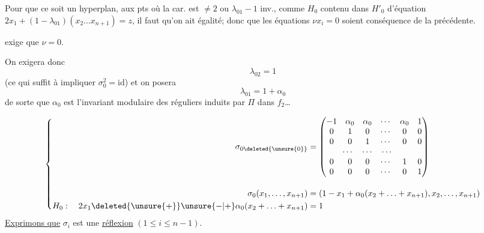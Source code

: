
Pour que ce soit un hyperplan,   aux pts où la car. est $\neq2$  ou $\lambda_{01}-1$ inv., comme  $H_0$ contenu dans $H'_0$ d'équation $2x_1+(1-\lambda_{01})(x_2\ldots x_{n+1})=z$, il faut qu'on ait égalité; donc que les équations $\nu x_i=0$  soient conséquence de la précédente.

  exige  que $\nu=0$.


On exigera donc
\[
\lambda_{02}=1
\]
 (ce qui suffit à impliquer $\sigma_0^2=\mathrm{id}$) et on posera
\[
\boxed{\lambda_{01}=1+\alpha_0}
\]
de sorte que $\alpha_0$ est l'invariant modulaire des  réguliers induits par $\Pi$ dans $f_2$\ldots

\[
\left\{\begin{aligned}
\sigma_{0\deleted{\unsure{0}}}&=\begin{pmatrix}
-1&\alpha_0&\alpha_0&\cdots&\alpha_0&1\\
0&1&0&\cdots&0&0\\
0&0&1&\cdots&0&0\\
\multicolumn{5}{c}{\cdots\quad\cdots\quad\cdots}&\\
0&0&0&\cdots&1&0\\
0&0&0&\cdots&0&1
\end{pmatrix}\\[1em]
\sigma_0(x_1,\ldots,x_{n+1})&=(1-x_1+\alpha_0(x_2+\ldots+x_{n+1}),x_2,\ldots,x_{n+1})\\
H_0:\quad2x_1\deleted{\unsure{+}}\unsure{-|+}\alpha_0(x_2+\ldots+x_{n+1})&=1
\end{aligned}\right.
\]
\uline{Exprimons que} $\sigma_i$ est une \uline{réflexion} $(1\leq i\leq n-1)$.

